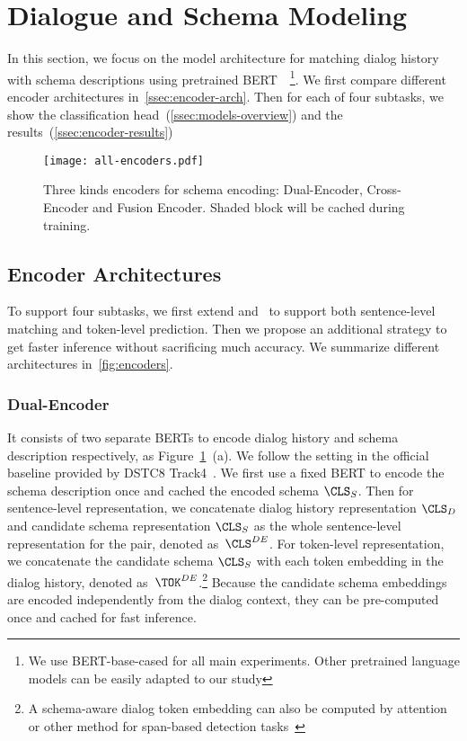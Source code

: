 \section[Dialogue and Schema Modeling]{Dialogue and Schema Modeling}
\label{sec:sgd:models}
In this section, we focus on the model architecture for matching
dialog history with schema descriptions using pretrained
BERT~\cite{devlin2019bert}~\footnote{We use BERT-base-cased for all
  main experiments. Other pretrained language models can be easily
  adapted to our study}. We first compare different encoder
architectures in~\autoref{ssec:encoder-arch}. Then for each of four
subtasks, we show the classification
head~(\autoref{ssec:models-overview}) and the results~(\autoref{ssec:encoder-results})

\begin{figure}[!t]
\centering
  \texttt{[image: all-encoders.pdf]}
  \caption{\label{fig:encoders} Three kinds encoders for schema
    encoding: Dual-Encoder, Cross-Encoder and Fusion Encoder. Shaded
    block will be cached during training.}
\end{figure}

\subsection{Encoder Architectures}
\label{ssec:encoder-arch}
To support four subtasks, we first extend \DE and \CE~to support both
sentence-level matching and token-level prediction. Then we propose an
additional \FE strategy to get faster inference without sacrificing
much accuracy. We summarize different architectures
in~\autoref{fig:encoders}.

\subsubsection{Dual-Encoder}
\label{sssec:sgd:dual-encoder}

It consists of two separate BERTs to encode dialog history and schema
description respectively, as Figure~\ref{fig:encoders}~(a). We follow
the setting in the official baseline provided by DSTC8
Track4~\cite{rastogi2020schema}. We first use a fixed BERT to encode
the schema description once and cached the encoded schema
$\CLS_{S}$. Then for sentence-level representation, we concatenate
dialog history representation $\CLS_{D}$ and candidate schema
representation $\CLS_{S}$ as the whole sentence-level representation
for the pair, denoted as~${\CLS^{DE}}$.  For token-level
representation, we concatenate the candidate schema $\CLS_{S}$ with
each token embedding in the dialog history, denoted
as~${\TOK^{DE}}$.\footnote{A schema-aware dialog token embedding can
  also be computed by attention or other method for span-based
  detection tasks~\cite{humeau2019poly, noroozi2020fast}} Because the
candidate schema embeddings are encoded independently from the dialog
context, they can be pre-computed once and cached for fast inference.

